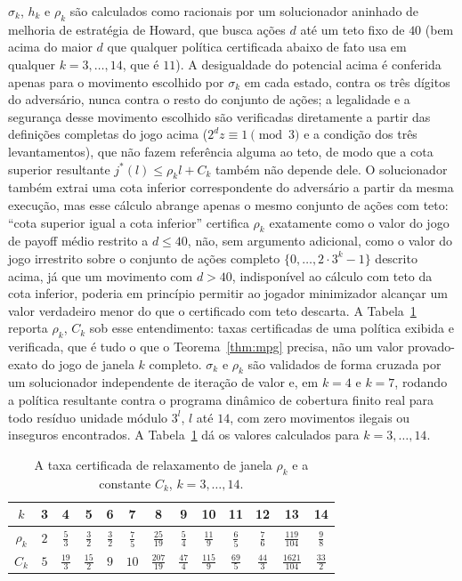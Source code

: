\documentclass[11pt]{amsart}
\theoremstyle{plain}
\theoremstyle{definition}
\theoremstyle{remark}
\begin{document}
$\sigma_k$, $h_k$ e $\rho_k$ são calculados como racionais por um solucionador aninhado de melhoria
de estratégia de Howard, que busca ações $d$ até um teto fixo de $40$ (bem acima do maior $d$ que
qualquer política certificada abaixo de fato usa em qualquer $k=3,\dots,14$, que é $11$). A
desigualdade do potencial acima é conferida apenas para o movimento escolhido por $\sigma_k$ em
cada estado, contra os três dígitos do adversário, nunca contra o resto do conjunto de ações; a
legalidade e a segurança desse movimento escolhido são verificadas diretamente a partir das
definições completas do jogo acima ($2^dz\equiv1\pmod3$ e a condição dos três levantamentos), que
não fazem referência alguma ao teto, de modo que a cota superior resultante $j^*(l)\le\rho_kl+C_k$
também não depende dele. O solucionador também extrai uma cota inferior correspondente do
adversário a partir da mesma execução, mas esse cálculo abrange apenas o mesmo conjunto de ações
com teto: ``cota superior igual a cota inferior'' certifica $\rho_k$ exatamente como o valor do
jogo de payoff médio restrito a $d\le40$, não, sem argumento adicional, como o valor do jogo
irrestrito sobre o conjunto de ações completo $\{0,\dots,2\cdot3^k-1\}$ descrito acima, já que um
movimento com $d>40$, indisponível ao cálculo com teto da cota inferior, poderia em princípio
permitir ao jogador minimizador alcançar um valor verdadeiro menor do que o certificado com teto
descarta. A Tabela~\ref{tab:mpg} reporta $\rho_k$, $C_k$ sob esse entendimento: taxas certificadas
de uma política exibida e verificada, que é tudo o que o Teorema~\ref{thm:mpg} precisa, não um
valor provado-exato do jogo de janela $k$ completo. $\sigma_k$ e $\rho_k$ são validados de forma
cruzada por um solucionador independente de iteração de valor e, em $k=4$ e $k=7$, rodando a
política resultante contra o programa dinâmico de cobertura finito real para todo resíduo unidade
módulo $3^l$, $l$ até $14$, com zero movimentos ilegais ou inseguros encontrados.
A Tabela~\ref{tab:mpg} dá os valores calculados para $k=3,\dots,14$.

\begin{table}[h]
\centering
\begin{tabular}{c|c|c|c|c|c|c|c|c|c|c|c|c}
$k$ & 3 & 4 & 5 & 6 & 7 & 8 & 9 & 10 & 11 & 12 & 13 & 14 \\ \hline
$\rho_k$ & $2$ & $\tfrac53$ & $\tfrac32$ & $\tfrac32$ & $\tfrac75$ & $\tfrac{25}{19}$ & $\tfrac54$ &
$\tfrac{11}{9}$ & $\tfrac65$ & $\tfrac76$ & $\tfrac{119}{104}$ & $\tfrac98$ \\ \hline
$C_k$ & $5$ & $\tfrac{19}{3}$ & $\tfrac{15}{2}$ & $9$ & $10$ & $\tfrac{207}{19}$ & $\tfrac{47}{4}$ &
$\tfrac{115}{9}$ & $\tfrac{69}{5}$ & $\tfrac{44}{3}$ & $\tfrac{1621}{104}$ & $\tfrac{33}{2}$
\end{tabular}
\caption{A taxa certificada de relaxamento de janela $\rho_k$ e a constante $C_k$, $k=3,\dots,14$.}
\label{tab:mpg}
\end{table}
\end{document}
